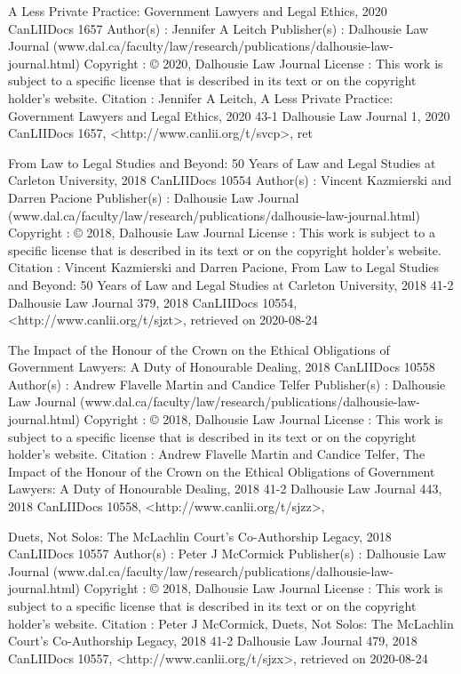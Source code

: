 A Less Private Practice: Government Lawyers and Legal Ethics, 2020 CanLIIDocs 1657
Author(s) : 	Jennifer A Leitch
Publisher(s) : 	Dalhousie Law Journal (www.dal.ca/faculty/law/research/publications/dalhousie-law-journal.html)
Copyright : 	© 2020, Dalhousie Law Journal
License : 	This work is subject to a specific license that is described in its text or on the copyright holder's website.
Citation : 	Jennifer A Leitch, A Less Private Practice: Government Lawyers and Legal Ethics, 2020 43-1 Dalhousie Law Journal 1, 2020 CanLIIDocs 1657, <http://www.canlii.org/t/svcp>, ret



From Law to Legal Studies and Beyond: 50 Years of Law and Legal Studies at Carleton University, 2018 CanLIIDocs 10554
Author(s) : 	Vincent Kazmierski and Darren Pacione
Publisher(s) : 	Dalhousie Law Journal (www.dal.ca/faculty/law/research/publications/dalhousie-law-journal.html)
Copyright : 	© 2018, Dalhousie Law Journal
License : 	This work is subject to a specific license that is described in its text or on the copyright holder's website.
Citation : 	Vincent Kazmierski and Darren Pacione, From Law to Legal Studies and Beyond: 50 Years of Law and Legal Studies at Carleton University, 2018 41-2 Dalhousie Law Journal 379, 2018 CanLIIDocs 10554, <http://www.canlii.org/t/sjzt>, retrieved on 2020-08-24



The Impact of the Honour of the Crown on the Ethical Obligations of Government Lawyers: A Duty of Honourable Dealing, 2018 CanLIIDocs 10558
Author(s) : 	Andrew Flavelle Martin and Candice Telfer
Publisher(s) : 	Dalhousie Law Journal (www.dal.ca/faculty/law/research/publications/dalhousie-law-journal.html)
Copyright : 	© 2018, Dalhousie Law Journal
License : 	This work is subject to a specific license that is described in its text or on the copyright holder's website.
Citation : 	Andrew Flavelle Martin and Candice Telfer, The Impact of the Honour of the Crown on the Ethical Obligations of Government Lawyers: A Duty of Honourable Dealing, 2018 41-2 Dalhousie Law Journal 443, 2018 CanLIIDocs 10558, <http://www.canlii.org/t/sjzz>, 



Duets, Not Solos: The McLachlin Court’s Co-Authorship Legacy, 2018 CanLIIDocs 10557
Author(s) : 	Peter J McCormick
Publisher(s) : 	Dalhousie Law Journal (www.dal.ca/faculty/law/research/publications/dalhousie-law-journal.html)
Copyright : 	© 2018, Dalhousie Law Journal
License : 	This work is subject to a specific license that is described in its text or on the copyright holder's website.
Citation : 	Peter J McCormick, Duets, Not Solos: The McLachlin Court’s Co-Authorship Legacy, 2018 41-2 Dalhousie Law Journal 479, 2018 CanLIIDocs 10557, <http://www.canlii.org/t/sjzx>, retrieved on 2020-08-24



